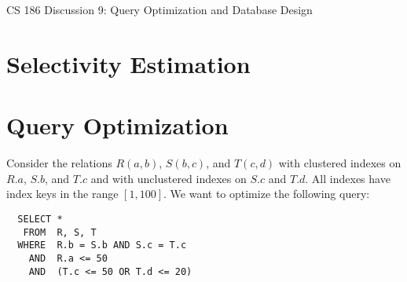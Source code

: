 \documentclass{article}
\begin{document}
\begin{center}
  \Large
  CS 186 Discussion 9: Query Optimization and Database Design
\end{center}

\section{Selectivity Estimation}
\section{Query Optimization}
Consider the relations $R(a, b)$, $S(b, c)$, and $T(c, d)$ with clustered
indexes on $R.a$, $S.b$, and $T.c$ and with unclustered indexes on $S.c$ and
$T.d$. All indexes have index keys in the range $[1, 100]$. We want to optimize
the following query:
\begin{verbatim}
  SELECT *
   FROM  R, S, T
  WHERE  R.b = S.b AND S.c = T.c
    AND  R.a <= 50
    AND  (T.c <= 50 OR T.d <= 20)
\end{verbatim}
\end{document}
